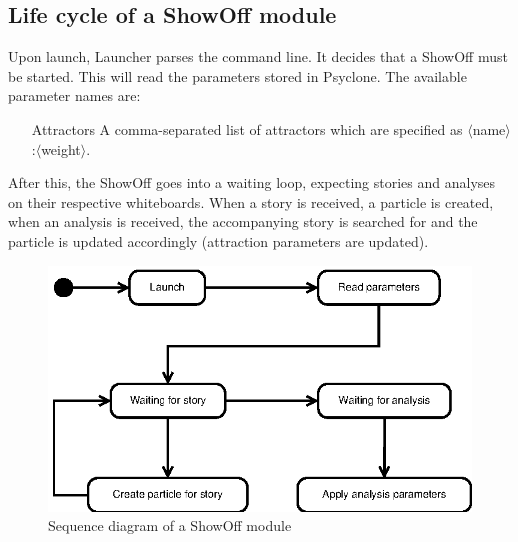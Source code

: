 \subsection{Life cycle of a ShowOff module}

Upon launch, Launcher parses the command line. It decides that a ShowOff must
be started. This will read the parameters stored in Psyclone. The available
parameter names are:

\begin{itemize}
 \item[Attractors] A comma-separated list of attractors which are specified as
                   $\langle$name$\rangle$:$\langle$weight$\rangle$.
\end{itemize}

After this, the ShowOff goes into a waiting loop, expecting stories and
analyses on their respective whiteboards. When a story is received, a particle
is created, when an analysis is received, the accompanying story is searched
for and the particle is updated accordingly (attraction parameters are
updated).

\begin{figure}[htp]
  \centering
  \includegraphics{design/image/sequence-diagram-showoff}
  \caption{Sequence diagram of a ShowOff module}
\end{figure}
